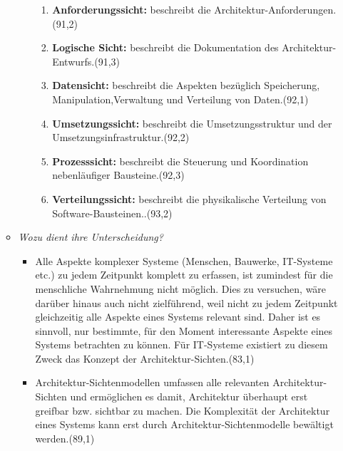 \begin{enumerate}[(a)]
\begin{itemize}
\begin{itemize}
\begin{enumerate}[1.]
                \item \textbf{Anforderungssicht:} beschreibt die Architektur-Anforderungen.(91,2)
                
                \item \textbf{Logische Sicht:} beschreibt die Dokumentation des Architektur-Entwurfs.(91,3)
                
                \item \textbf{Datensicht:} beschreibt die Aspekten bezüglich Speicherung, Manipulation,Verwaltung und Verteilung von Daten.(92,1)
                
                \item \textbf{Umsetzungssicht:} beschreibt die Umsetzungsstruktur und der Umsetzungsinfrastruktur.(92,2)
                
                \item \textbf{Prozesssicht:} beschreibt die Steuerung und Koordination nebenläufiger Bausteine.(92,3)
                
                \item \textbf{Verteilungssicht:} beschreibt die physikalische Verteilung von Software-Bausteinen..(93,2)
            \end{enumerate}
            

        \end{itemize}
        
        \item {\itshape Wozu dient ihre Unterscheidung?}
        \begin{itemize}
            \item Alle Aspekte komplexer Systeme (Menschen, Bauwerke, IT-Systeme etc.) zu jedem Zeitpunkt komplett zu erfassen, ist zumindest für die menschliche Wahrnehmung nicht möglich. Dies zu versuchen, wäre darüber hinaus auch nicht zielführend, weil nicht zu jedem Zeitpunkt gleichzeitig alle Aspekte eines Systems relevant sind. Daher ist es sinnvoll, nur bestimmte, für den Moment interessante Aspekte eines Systems betrachten zu können. Für IT-Systeme existiert zu diesem Zweck das Konzept der Architektur-Sichten.(83,1)

            \item Architektur-Sichtenmodellen umfassen alle relevanten Architektur-Sichten und ermöglichen es damit, Architektur überhaupt erst greifbar bzw. sichtbar zu machen. Die Komplexität der Architektur eines Systems kann erst durch Architektur-Sichtenmodelle bewältigt werden.(89,1)


\end{itemize}
\end{itemize}
\end{enumerate}
